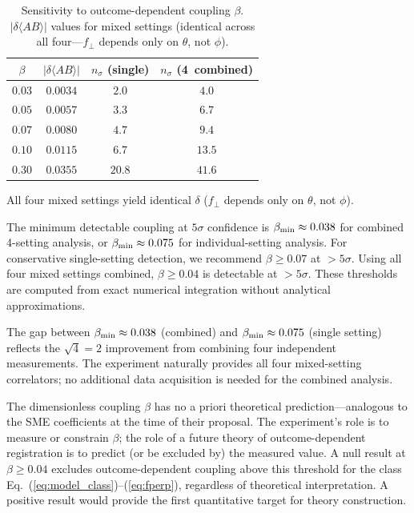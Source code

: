 \documentclass[twocolumn,aps,pra,superscriptaddress,floatfix,10pt]{revtex4-2}
\begin{document}
\begin{table}[ht]
\centering
\caption{Sensitivity to outcome-dependent coupling $\beta$.
$|\delta\langle AB\rangle|$ values for mixed settings (identical
across all four---$f_\perp$ depends only on $\theta$, not $\phi$).}
\label{tab:sensitivity}
\begin{tabular}{cccc}
\toprule
$\beta$ & $|\delta\langle AB\rangle|$ & $n_\sigma$ (single) & $n_\sigma$ (4~combined) \\
\midrule
$0.03$ & $0.0034$ & $2.0$ & $4.0$ \\
$0.05$ & $0.0057$ & $3.3$ & $6.7$ \\
$0.07$ & $0.0080$ & $4.7$ & $9.4$ \\
$0.10$ & $0.0115$ & $6.7$ & $13.5$ \\
$0.30$ & $0.0355$ & $20.8$ & $41.6$ \\
\bottomrule
\end{tabular}
\end{table}

All four mixed settings yield identical $\delta$ ($f_\perp$ depends
only on $\theta$, not $\phi$).

The minimum detectable coupling at $5\sigma$ confidence is
$\beta_{\rm min} \approx 0.038$ for combined 4-setting analysis, or
$\beta_{\rm min} \approx 0.075$ for individual-setting analysis. For
conservative single-setting detection, we recommend $\beta \ge 0.07$
at $>5\sigma$. Using all four mixed settings combined,
$\beta \ge 0.04$ is detectable at $>5\sigma$. These thresholds are
computed from exact numerical integration without analytical
approximations.

The gap between $\beta_{\rm min} \approx 0.038$ (combined) and
$\beta_{\rm min} \approx 0.075$ (single setting) reflects the
$\sqrt{4} = 2$ improvement from combining four independent
measurements. The experiment naturally provides all four mixed-setting
correlators; no additional data acquisition is needed for the combined
analysis.

The dimensionless coupling $\beta$ has no a priori theoretical
prediction---analogous to the SME coefficients at the time of their
proposal. The experiment's role is to measure or constrain $\beta$;
the role of a future theory of outcome-dependent registration is to
predict (or be excluded by) the measured value. A null result at
$\beta \ge 0.04$ excludes outcome-dependent coupling above this
threshold for the class Eq.~(\ref{eq:model_class})--(\ref{eq:fperp}),
regardless of theoretical interpretation. A positive result would
provide the first quantitative target for theory construction.
\end{document}
